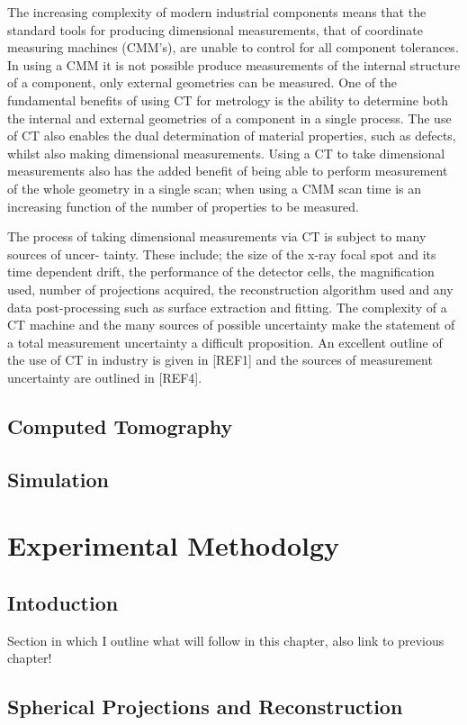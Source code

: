 \documentclass[
  twoside,
  11pt, a4paper,
  footinclude=true,
  headinclude=true,
  cleardoublepage=empty
]{scrbook}
\begin{document}
The increasing complexity of modern industrial components means that the standard tools for producing dimensional measurements, that of coordinate measuring machines (CMM’s), are unable to control for all component tolerances. In using a CMM it is not possible produce measurements of the internal structure of a component, only external geometries can be measured. One of the fundamental benefits of using CT for metrology is the ability to determine both the internal and external geometries of a component in a single process. The use of CT also enables the dual determination of material properties, such as defects, whilst also making dimensional measurements. Using a CT to take dimensional measurements also has the added benefit of being able to perform measurement of the whole geometry in a single scan; when using a CMM scan time is an increasing function of the number of properties to be measured.

The process of taking dimensional measurements via CT is subject to many sources of uncer- tainty. These include; the size of the x-ray focal spot and its time dependent drift, the performance of the detector cells, the magnification used, number of projections acquired, the reconstruction algorithm used and any data post-processing such as surface extraction and fitting. The complexity of a CT machine and the many sources of possible uncertainty make the statement of a total measurement uncertainty a difficult proposition. An excellent outline of the use of CT in industry is given in [REF1] and the sources of measurement uncertainty are outlined in [REF4].


\section{Computed Tomography}
\section{Simulation}
\chapter{Experimental Methodolgy}
\section{Intoduction}

Section in which I outline what will follow in this chapter, also link to previous chapter!

\section{Spherical Projections and Reconstruction}
\end{document}
